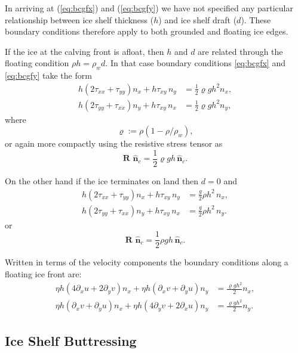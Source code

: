 \documentclass[10pt,a4paper]{book}
\newcommand{\p}{\partial}
\newcommand{\txx}{\tau_{xx}}
\newcommand{\tyy}{\tau_{yy}}
\newcommand{\txy}{\tau_{xy}}
\newcommand{\normalc}{\hat{\bm{n}}_{c}}
\begin{document}
In arriving at (\ref{eq:bcgfx}) and (\ref{eq:bcgfy}) we have not
specified any particular relationship between ice shelf thickness
($h$) and ice shelf draft ($d$). These boundary conditions therefore
apply to both grounded and floating ice edges.




If the ice at the calving front is afloat, then $h$ and $d$ are
related through the floating condition $\rho h =\rho_w d$. In that case  boundary
conditions \eqref{eq:bcgfx} and \eqref{eq:bcgfy} take the form
\begin{align}
h (2 \txx + \tyy) n_x + h \txy \,n_y &= \frac{1}{2} \varrho g h^2   n_x ,\label{eq:bgfxfloat} \\
h (2 \tyy + \txx) n_y + h \txy \,n_x &= \frac{1}{2} \varrho g h^2   n_y ,\label{eq:bgfyfloat} 
\end{align}
where
\[
\varrho:=\rho (1-\rho/\rho_w) ,
\]
or again more compactly using the resistive stress tensor as 
\begin{equation}
\bm{R}\, \, \normalc=\frac{1}{2} \varrho g h  \, \normalc.
\label{eq:BCCFfloat}
\end{equation}


On the other hand if the ice terminates on land then $d=0$ and 
\begin{align}
h (2 \txx + \tyy) n_x + h \txy \,n_y &=  \frac{g}{2} \rho h^2 \, n_x  ,\label{eq:bcgfxgrounded} \\
h (2 \tyy + \txx) n_y + h \txy \, n_x &=  \frac{g}{2} \rho h^2 \, n_y .\label{eq:bcgfygrounded} 
\end{align}
or
\begin{equation}
\bm{R}\, \, \normalc=\frac{1}{2} \rho g h  \, \normalc.
\label{eq:BCCFgrounded}
\end{equation}


Written in terms of the velocity components the boundary conditions along a floating ice front are:
\begin{align}
  \eta h (4 \p_x u + 2  \p_y v) n_x + \eta h (\p_x v +\p_y u) n_y &= \frac{\varrho g h^2 }{2}  n_x ,\\
\eta h (\p_x v + \p_y u) n_x + \eta h ( 4 \p_y v + 2 \p_x u) n_y &= \frac{\varrho g h^2 }{2}  n_y .
\end{align}



\subsection{Ice Shelf Buttressing}
\end{document}
